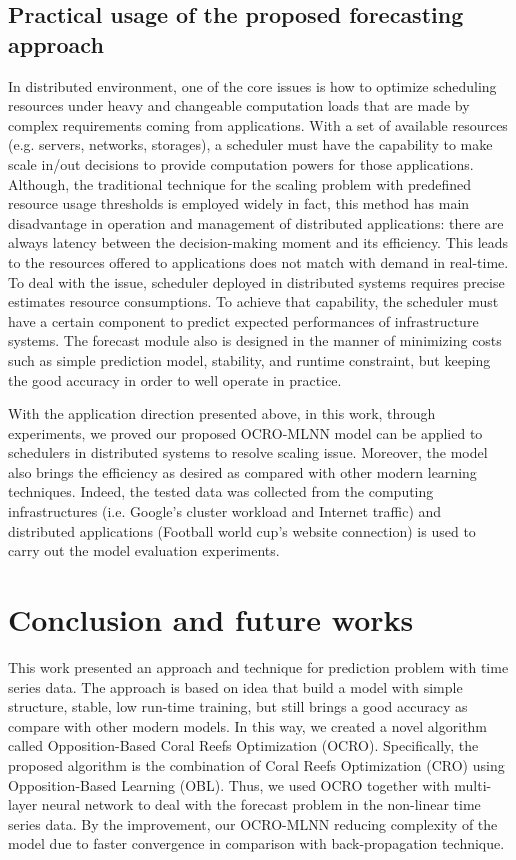 \documentclass[smallcondensed, natbib]{svjour3}     %
\begin{document}
{\subsection{Practical usage of the proposed forecasting approach}
\label{pratical_usage}
In distributed environment, one of the core issues is how to optimize scheduling resources under heavy and changeable computation loads that are made by complex requirements coming from applications. With a set of available resources (e.g. servers, networks, storages), a scheduler must have the capability to make scale in/out decisions to provide computation powers for those applications. Although, the traditional technique for the scaling problem with predefined resource usage thresholds is employed widely in fact, this method has main disadvantage in operation and management of distributed applications: there are always latency between the decision-making moment and its efficiency. This leads to the resources offered to applications does not match with demand in real-time. To deal with the issue, scheduler deployed in distributed systems requires precise estimates resource consumptions. To achieve that capability, the scheduler must have a certain component to predict expected performances of infrastructure systems. The forecast module also is designed in the manner of minimizing costs such as simple prediction model, stability, and runtime constraint, but keeping the good accuracy in order to well operate in practice. 

With the application direction presented above, in this work, through experiments, we proved our proposed OCRO-MLNN model can be applied to schedulers in distributed systems to resolve scaling issue. Moreover, the model also brings the efficiency as desired as compared with other modern learning techniques. Indeed, the tested data was collected from the computing infrastructures (i.e. Google's cluster workload and Internet traffic) and distributed applications (Football world cup's website connection) is used to carry out the model evaluation experiments. 

\section{Conclusion and future works}
\label{conclusion}
This work presented an approach and technique for prediction problem with time series data. The approach is based on idea that build a model with simple structure, stable, low run-time training, but still brings a good accuracy as compare with other modern models. In this way, we created a novel algorithm called Opposition-Based Coral Reefs Optimization (OCRO). Specifically, the proposed algorithm is the combination of Coral Reefs Optimization (CRO) using Opposition-Based Learning (OBL). Thus, we used OCRO together with multi-layer neural network to deal with the forecast problem in the non-linear time series data. By the improvement, our OCRO-MLNN reducing complexity of the model due to faster convergence in comparison with back-propagation technique. 

}
\end{document}
